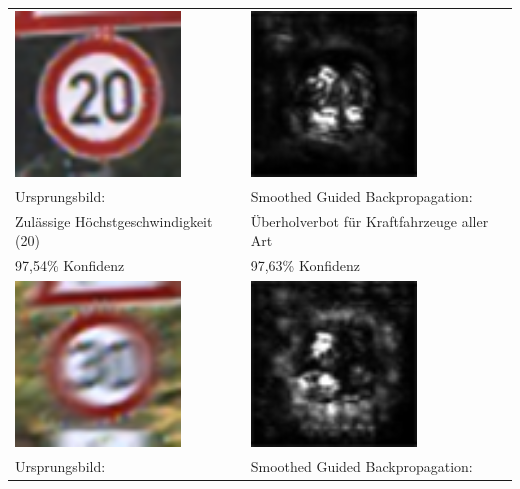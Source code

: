 \begin{table}
	\centering
	\begin{tabular}{p{8cm}p{8cm}}
		\includegraphics[height=4.4cm]{Images/AnPe/5_2_Oben-links} & \includegraphics[height=4.4cm]{Images/AnPe/5_2_Oben_rechts} \\
		Ursprungsbild: & Smoothed Guided Backpropagation:\\
		Zulässige Höchstgeschwindigkeit (20) & Überholverbot für Kraftfahrzeuge aller Art\\
		97,54\% Konfidenz & 97,63\% Konfidenz\\
		\includegraphics[height=4.4cm]{Images/AnPe/5_2_Mitte-links} &
		\includegraphics[height=4.4cm]{Images/AnPe/5_2_Mitte_rechts}  \\
		Ursprungsbild: & Smoothed Guided Backpropagation:\\

\end{tabular}
\end{table}
